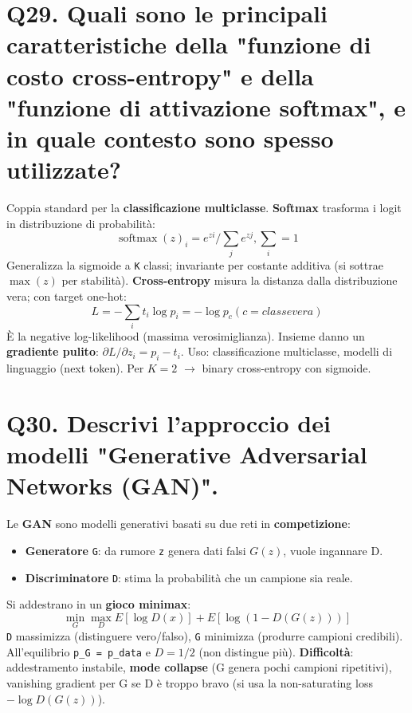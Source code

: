 \documentclass[11pt,a4paper]{article}
\begin{document}
\section*{Q29. Quali sono le principali caratteristiche della "funzione di costo cross-entropy" e della "funzione di attivazione softmax", e in quale contesto sono spesso utilizzate?}
Coppia standard per la \textbf{classificazione multiclasse}.
\textbf{Softmax} trasforma i logit in distribuzione di probabilità:
\[ \operatorname{softmax}(z)_{i} = e^{zi} / \sum _{j} e^{zj},    \sum _{i} = 1 \]
Generalizza la sigmoide a \texttt{K} classi; invariante per costante additiva (si sottrae $\operatorname{max}(z)$ per stabilità).
\textbf{Cross-entropy} misura la distanza dalla distribuzione vera; con target one-hot:
\[ L = - \sum _{i} t_{i} \operatorname{log} p_{i} = - \operatorname{log} p_c   (c = classe vera) \]
È la negative log-likelihood (massima verosimiglianza).
Insieme danno un \textbf{gradiente pulito}: $\partial L/\partial z_{i} = p_{i} - t_{i}$. Uso: classificazione multiclasse, modelli di linguaggio (next token). Per $K=2$ $\to $ binary cross-entropy con sigmoide.
\newpage
\section*{Q30. Descrivi l'approccio dei modelli "Generative Adversarial Networks (GAN)".}
Le \textbf{GAN} sono modelli generativi basati su due reti in \textbf{competizione}:
\begin{itemize}
\item \textbf{Generatore} \texttt{G}: da rumore \texttt{z} genera dati falsi $G(z)$, vuole ingannare D.
\item \textbf{Discriminatore} \texttt{D}: stima la probabilità che un campione sia reale.
\end{itemize}
Si addestrano in un \textbf{gioco minimax}:
\[ \operatorname{min}_G \operatorname{max}_D  E[\operatorname{log} D(x)] + E[\operatorname{log}(1 - D(G(z)))] \]
\texttt{D} massimizza (distinguere vero/falso), \texttt{G} minimizza (produrre campioni credibili). All'equilibrio \texttt{p\_G = p\_data} e $D = 1/2$ (non distingue più).
\textbf{Difficoltà}: addestramento instabile, \textbf{mode collapse} (G genera pochi campioni ripetitivi), vanishing gradient per G se D è troppo bravo (si usa la non-saturating loss $-\operatorname{log} D(G(z))$).
\newpage
\end{document}
